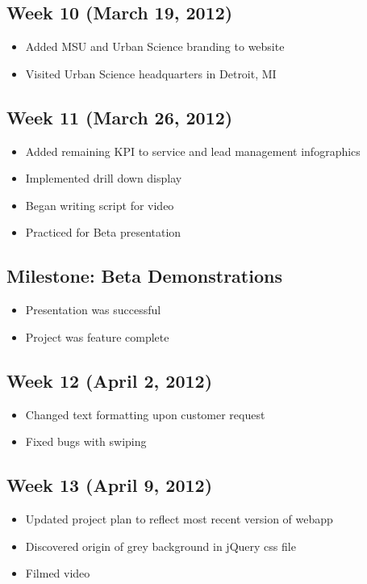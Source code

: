 \documentclass[11pt,a4paper,oneside]{article}
\begin{document}
\subsection{Week 10 (March 19, 2012)}
\begin{itemize}
\item Added MSU and Urban Science branding to website
\item Visited Urban Science headquarters in Detroit, MI
\end{itemize}

\subsection{Week 11 (March 26, 2012)}
\begin{itemize}
\item Added remaining KPI to service and lead management infographics
\item Implemented drill down display
\item Began writing script for video
\item Practiced for Beta presentation
\end{itemize}

\subsection{Milestone: Beta Demonstrations}
\begin{itemize}
\item Presentation was successful
\item Project was feature complete
\end{itemize}

\subsection{Week 12 (April 2, 2012)}
\begin{itemize}
\item Changed text formatting upon customer request
\item Fixed bugs with swiping 
\end{itemize}

\subsection{Week 13 (April 9, 2012)}
\begin{itemize}
\item Updated project plan to reflect most recent version of webapp
\item Discovered origin of grey background in jQuery css file
\item Filmed video
\end{itemize}
\end{document}
